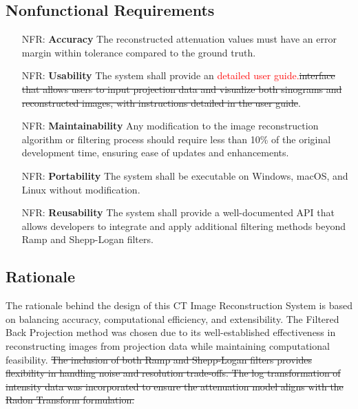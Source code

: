 \documentclass[12pt]{article}
\newcounter{nfrnum} %
\newcommand{\add}{\textcolor{red}}
\begin{document}
\subsection{Nonfunctional Requirements}
\noindent \begin{itemize}

\item[NFR\refstepcounter{nfrnum}\thenfrnum \label{NFR_Accuracy}:]
  \textbf{Accuracy} The reconstructed attenuation values must have an error margin
  within tolerance compared to the ground truth.

\item[NFR\refstepcounter{nfrnum}\thenfrnum \label{NFR_Usability}:] \textbf{Usability} The
  system shall provide an \add{detailed user guide.}\st{interface that allows users to input projection data
  and visualize both sinograms and reconstructed images, with instructions
  detailed in the user guide}.

\item[NFR\refstepcounter{nfrnum}\thenfrnum \label{NFR_Maintainability}:]
  \textbf{Maintainability} Any modification to the image reconstruction
  algorithm or filtering process should require less than 10\% of the original
  development time, ensuring ease of updates and enhancements.

\item[NFR\refstepcounter{nfrnum}\thenfrnum \label{NFR_Portability}:]
  \textbf{Portability} The system shall be executable on Windows, macOS, and
  Linux without modification.

\item[NFR\refstepcounter{nfrnum}\thenfrnum \label{NFR_Reusability}:]
  \textbf{Reusability} The system shall provide a well-documented API that allows
  developers to integrate and apply additional filtering methods beyond Ramp and
  Shepp-Logan filters.
\end{itemize}

\subsection{Rationale}
The rationale behind the design of this CT Image Reconstruction System is based
on balancing accuracy, computational efficiency, and extensibility. The Filtered
Back Projection method was chosen due to its well-established
effectiveness in reconstructing images from projection data while maintaining
computational feasibility.\st{ The inclusion of both Ramp and Shepp-Logan filters
provides flexibility in handling noise and resolution trade-offs. The log
transformation of intensity data was incorporated to ensure the attenuation
model aligns with the Radon Transform formulation.}\\
\end{document}
